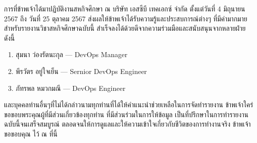 \begin{acknowledgments}
    การที่ข้าพเจ้าได้มาปฏิบัติงานสหกิจศึกษา ณ บริษัท เอสซีบี เทคเอกซ์ จำกัด  ตั้งแต่วันที่ 4 มิถุนายน 2567  ถึง วันที่  25 ตุลาคม 2567  ส่งผลให้ข้าพเจ้าได้รับความรู้และประสบการณ์ต่างๆ ที่มีค่ามากมาย สำหรับรายงานวิชาสหกิจศึกษาฉบับนี้  สำเร็จลงได้ด้วยดีจากความร่วมมือและสนับสนุนจากหลายฝ่าย  ดังนี้
    \begin{enumerate}
        \item สุมนา ว่องรัตนะกุล — DevOps Manager
        \item พีรวัตร อยู่ใจเย็น — Sernior DevOps Engineer
        \item ภัทรพล หมวกมณี — DevOps Engineer
    \end{enumerate}
    และบุคคลท่านอื่นๆที่ไม่ได้กล่าวนามทุกท่านที่ได้ให้คำแนะนำช่วยเหลือในการจัดทำรายงาน
	ข้าพเจ้าใคร่ขอขอบพระคุณผู้ที่มีส่วนเกี่ยวข้องทุกท่าน ที่มีส่วนร่วมในการให้ข้อมูล เป็นที่ปรึกษาในการทำรายงานฉบับนี้จนเสร็จสมบูรณ์ ตลอดจนให้การดูแลและให้ความเข้าใจเกี่ยวกับชีวิตของการทำงานจริง ข้าพเจ้าขอขอบคุณ ไว้ ณ ที่นี้
\end{acknowledgments}%
\fi %

\contentspage %

\ifproject
\tablelistpage
\figurelistpage

\fi %



